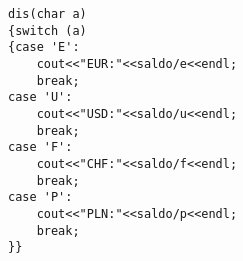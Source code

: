 \begin{verbatim}
dis(char a)
{switch (a)
{case 'E':
	cout<<"EUR:"<<saldo/e<<endl;	
    break;
case 'U':
	cout<<"USD:"<<saldo/u<<endl;	
	break;
case 'F':
	cout<<"CHF:"<<saldo/f<<endl;	
	break;
case 'P':
	cout<<"PLN:"<<saldo/p<<endl;	
    break;
}}

\end{verbatim}